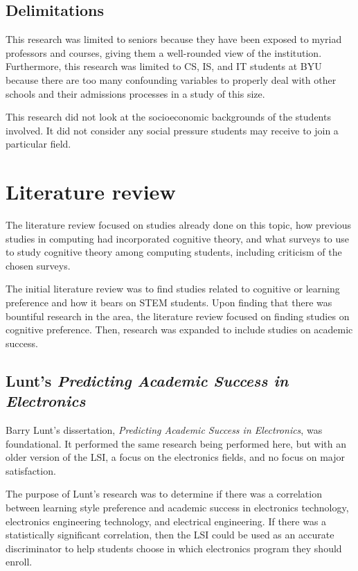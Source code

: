 \subsection{Delimitations}
This research was limited to seniors because they have been exposed to myriad professors and courses, giving them a well-rounded view of the institution. Furthermore, this research was limited to CS, IS, and IT students at BYU because there are too many confounding variables to properly deal with other schools and their admissions processes in a study of this size.

This research did not look at the socioeconomic backgrounds of the students involved. It did not consider any social pressure students may receive to join a particular field.

\section{Literature review}
The literature review focused on studies already done on this topic, how previous studies in computing had incorporated cognitive theory, and what surveys to use to study cognitive theory among computing students, including criticism of the chosen surveys.

The initial literature review was to find studies related to cognitive or learning preference and how it bears on STEM students. Upon finding that there was bountiful research in the area, the literature review focused on finding studies on cognitive preference. Then, research was expanded to include studies on academic success.

\subsection{Lunt's \textit{Predicting Academic Success in Electronics}}
Barry Lunt's dissertation, \textit{Predicting Academic Success in Electronics}, was foundational. It performed the same research being performed here, but with an older version of the LSI, a focus on the electronics fields, and no focus on major satisfaction.

The purpose of Lunt's research was to determine if there was a correlation between learning style preference and academic success in electronics technology, electronics engineering technology, and electrical engineering. If there was a statistically significant correlation, then the LSI could be used as an accurate discriminator to help students choose in which electronics program they should enroll.

